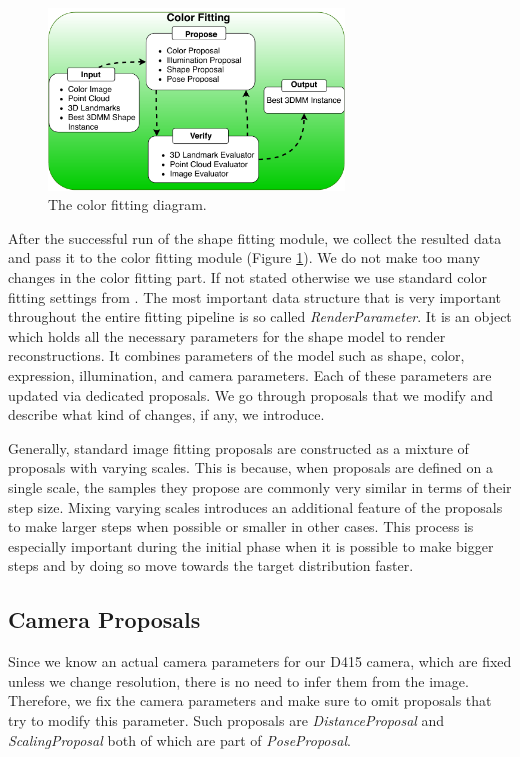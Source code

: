 \begin{figure}[h!]
  \centering
  \includegraphics[width=0.7\textwidth]{Figures/ColorFitting.pdf}
  \caption{The color fitting diagram.}
  \label{colorF}
\end{figure}
After the successful run of the shape fitting module, we collect the resulted data and pass it to the color fitting module (Figure \ref{colorF}). We do not make too many changes in the color fitting part. If not stated otherwise we use standard color fitting settings from \cite{Schoenborn2017}. The most important data structure that is very important throughout the entire fitting pipeline is so called \textit{RenderParameter}. It is an object which holds all the necessary parameters for the shape model to render reconstructions. It combines parameters of the model such as shape, color, expression, illumination, and camera parameters. Each of these parameters are updated via dedicated proposals. We go through proposals that we modify and describe what kind of changes, if any, we introduce.\bigskip

Generally, standard image fitting proposals are constructed as a mixture of proposals with varying scales. This is because, when proposals are defined on a single scale, the samples they propose are commonly very similar in terms of their step size. Mixing varying scales introduces an additional feature of the proposals to make larger steps when possible or smaller in other cases. This process is especially important during the initial phase when it is possible to make bigger steps and by doing so move towards the target distribution faster. 


\subsection*{Camera Proposals}
Since we know an actual camera parameters for our D415 camera, which are fixed unless we change resolution, there is no need to infer them from the image. Therefore, we fix the camera parameters and make sure to omit proposals that try to modify this parameter. Such proposals are \textit{DistanceProposal} and \textit{ScalingProposal} both of which are part of \textit{PoseProposal}.

